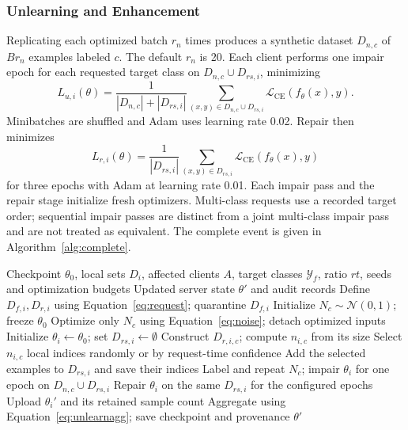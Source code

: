 \documentclass[software,article,submit,moreauthors]{Definitions/mdpi}
\newcommand{\CE}{\mathcal{L}_{\mathrm{CE}}}
\begin{document}
\subsubsection{Unlearning and Enhancement}
\label{sec:updates}
Replicating each optimized batch $r_n$ times produces a synthetic dataset
$D_{n,c}$ of $B r_n$ examples labeled $c$. The default $r_n$ is 20. Each client
performs one impair epoch for each requested target class on
$D_{n,c}\cup D_{rs,i}$, minimizing
\begin{equation}
L_{u,i}(\theta)=\frac{1}{|D_{n,c}|+|D_{rs,i}|}
\sum_{(x,y)\in D_{n,c}\cup D_{rs,i}}\CE(f_\theta(x),y).
\label{eq:impair}
\end{equation}
Minibatches are shuffled and Adam uses learning rate 0.02. Repair then minimizes
\begin{equation}
L_{r,i}(\theta)=\frac{1}{|D_{rs,i}|}
\sum_{(x,y)\in D_{rs,i}}\CE(f_\theta(x),y)
\label{eq:repair}
\end{equation}
for three epochs with Adam at learning rate 0.01. Each impair pass and the repair
stage initialize fresh optimizers. Multi-class requests use a
recorded target order; sequential impair passes are distinct from a joint
multi-class impair pass and are not treated as equivalent. The complete event is
given in Algorithm~\ref{alg:complete}.

\begin{algorithm}[t]
\caption{Fed-EMNU event with explicit request scope}
\label{alg:complete}
\begin{algorithmic}[1]
\REQUIRE Checkpoint $\theta_0$, local sets $D_i$, affected clients $A$, target
classes $\mathcal{Y}_f$, ratio $rt$, seeds and optimization budgets
\ENSURE Updated server state $\theta'$ and audit records
\STATE Define $D_{f,i},D_{r,i}$ using Equation~\ref{eq:request}; quarantine $D_{f,i}$
\STATE Initialize $N_c\sim\mathcal{N}(0,1)$; freeze $\theta_0$
\STATE Optimize only $N_c$ using Equation~\ref{eq:noise}; detach optimized inputs
\ENDFOR
{}
\STATE Initialize $\theta_i\leftarrow\theta_0$; set $D_{rs,i}\leftarrow\emptyset$
\STATE Construct $D_{r,i,c}$; compute $n_{i,c}$ from its size
\STATE Select $n_{i,c}$ local indices randomly or by request-time confidence
\STATE Add the selected examples to $D_{rs,i}$ and save their indices
\ENDFOR
{}
\STATE Label and repeat $N_c$; impair $\theta_i$ for one epoch on $D_{n,c}\cup D_{rs,i}$
\ENDFOR
\STATE Repair $\theta_i$ on the same $D_{rs,i}$ for the configured epochs
\STATE Upload $\theta_i'$ and its retained sample count
\ENDFOR
\STATE Aggregate using Equation~\ref{eq:unlearnagg}; save checkpoint and provenance
\RETURN $\theta'$
\end{algorithmic}
\end{algorithm}
\end{document}
